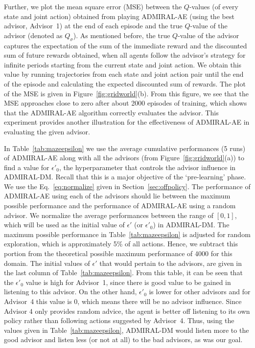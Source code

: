 \documentclass[jair, twoside,11pt,theapa]{article}
\begin{document}
Further, we plot the mean square error (MSE) between the $Q$-values (of every state and joint action) obtained from playing ADMIRAL-AE (using the best advisor, Advisor~1) at the end of each episode and the true $Q$-value of the advisor (denoted as $Q_\sigma$). As mentioned before, the true $Q$-value of the advisor captures the expectation of the sum of the immediate reward and the discounted sum of future rewards obtained, when all agents follow the advisor's strategy for infinite periods starting from the current state and joint action. We obtain this value by running trajectories from each state and joint action pair until the end of the episode and calculating the expected discounted sum of rewards. The plot of the MSE is given in Figure~\ref{fig:gridworld}(b). From this figure, we see that the MSE approaches close to zero after about 2000 episodes of training, which shows that the ADMIRAL-AE algorithm correctly evaluates the advisor. This experiment provides another illustration for the effectiveness of ADMIRAL-AE in evaluating the given advisor. 



In Table~\ref{tab:mazeepsilon} we use the average cumulative performances (5 runs) of ADMIRAL-AE along with all the advisors (from Figure~\ref{fig:gridworld}(a)) to find a value for $\epsilon'_0$, the hyperparameter that controls the advisor influence in ADMIRAL-DM. Recall that this is a major objective of the `pre-learning' phase. We use the Eq.~\ref{eq:normalize} given in Section~\ref{sec:offpolicy}. The performance of ADMIRAL-AE using each of the advisors should lie between the maximum possible performance and the performance of ADMIRAL-AE using a random advisor. We normalize the average performances between the range of $[0,1]$, which will be used as the initial value of $\epsilon'$ (or $\epsilon'_0$) in ADMIRAL-DM. The maximum possible performance in Table~\ref{tab:mazeepsilon} is adjusted for random exploration, which is approximately 5\% of all actions. Hence, we subtract this portion from the theoretical possible maximum performance of 4000 for this domain. The initial values of $\epsilon'$ that would pertain to the advisors, are given in the last column of Table~\ref{tab:mazeepsilon}. From this table, it can be seen that the $\epsilon'_0$ value is high for Advisor~1, since there is good value to be gained in listening to this advisor. On the other hand, $\epsilon'_0$ is lower for other advisors and for Advisor~4 this value is 0, which means there will be no advisor influence.  Since Advisor 4 only provides random advice, the agent is better off listening to its own policy rather than following actions suggested by  Advisor~4. Thus, using the values given in Table~\ref{tab:mazeepsilon}, ADMIRAL-DM would listen more to the good advisor and listen less (or not at all) to the bad advisors, as was our goal. 
\end{document}
